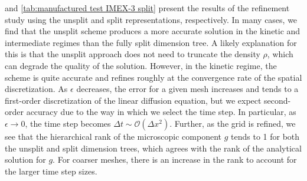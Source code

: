 \documentclass[onefignum,onetabnum]{siamart220329}
\begin{document}
 and \cref{tab:manufactured test IMEX-3 split} present the results of the refinement study using the unsplit and split representations, respectively. In many cases, we find that the unsplit scheme produces a more accurate solution in the kinetic and intermediate regimes than the fully split dimension tree. A likely explanation for this is that the unsplit approach does not need to truncate the density $\rho$, which can degrade the quality of the solution. However, in the kinetic regime, the scheme is quite accurate and refines roughly at the convergence rate of the spatial discretization. As $\epsilon$ decreases, the error for a given mesh increases and tends to a first-order discretization of the linear diffusion equation, but we expect second-order accuracy due to the way in which we select the time step. In particular, as $\epsilon \rightarrow 0$, the time step becomes $\Delta t \sim \mathcal{O}(\Delta x^{2})$. Further, as the grid is refined, we see that the hierarchical rank of the microscopic component $g$ tends to 1 for both the unsplit and split dimension trees, which agrees with the rank of the analytical solution for $g$. For coarser meshes, there is an increase in the rank to account for the larger time step sizes.
\end{document}
